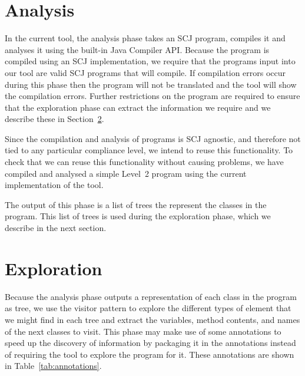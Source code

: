 \documentclass[10pt,a4paper]{article}
\begin{document}
\section{Analysis}
\label{sec:analysis}

In the current tool, the analysis phase takes an SCJ program, compiles it and analyses it using the built-in Java Compiler API. Because the program is compiled using an SCJ implementation, we require that the programs input into our tool are valid SCJ programs that will compile. If compilation errors occur during this phase then the program will not be translated and the tool will show the compilation errors. Further restrictions on the program are required to ensure that the exploration phase can extract the information we require and we describe these in Section~\ref{sec:exploration}.

Since the compilation and analysis of programs is SCJ agnostic, and therefore not tied to any particular compliance level, we intend to reuse this functionality. To check that we can reuse this functionality without causing problems, we have compiled and analysed a simple Level~2 program using the current implementation of the tool. 

The output of this phase is a list of trees the represent the classes in the program. This list of trees is used during the exploration phase, which we describe in the next section.

\section{Exploration}
\label{sec:exploration}


Because the analysis phase outputs a representation of each class in the program as tree, we use the visitor pattern to explore the different types of element that we might find in each tree and extract the variables, method contents, and names of the next classes to visit. This phase may make use of some annotations to speed up the discovery of information by packaging it in the annotations instead of requiring the tool to explore the program for it. These annotations are shown in Table~\ref{tab:annotations}.
\end{document}
